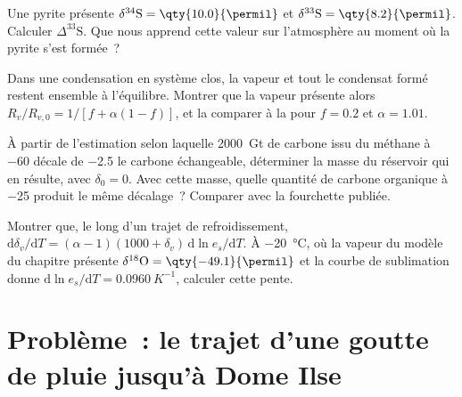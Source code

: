 \begin{exercise}[$\star\star$]\label{exo:b3:stable-isotopes:9}
Une pyrite présente $\delta^{34}\mathrm S = \qty{10.0}{\permil}$ et $\delta^{33}\mathrm S =
\qty{8.2}{\permil}$. Calculer $\Delta^{33}\mathrm S$. Que nous apprend cette valeur sur
l'atmosphère au moment où la pyrite s'est formée~?
\end{exercise}

\begin{exercise}[$\star\star\star$]\label{exo:b3:stable-isotopes:10}
Dans une condensation en système clos, la vapeur et tout le condensat formé restent
ensemble à l'équilibre. Montrer que la vapeur présente alors $R_v/R_{v,0} = 1/[f +
\alpha(1 - f)]$, et la comparer à la  pour $f = 0.2$ et
$\alpha = 1.01$.
\end{exercise}

\begin{exercise}[$\star\star\star$]\label{exo:b3:stable-isotopes:11}
À partir de l'estimation selon laquelle \qty{2000}{Gt} de carbone issu du méthane à
\qty{-60}{\permil} décale de \qty{-2.5}{\permil} le carbone échangeable,
déterminer la masse du réservoir qui en résulte, avec $\delta_0 = 0$. Avec cette masse, quelle quantité de
carbone organique à \qty{-25}{\permil} produit le même décalage~? Comparer avec la
fourchette publiée.
\end{exercise}

\begin{exercise}[$\star\star\star$]\label{exo:b3:stable-isotopes:12}
Montrer que, le long d'un trajet de refroidissement, $\mathrm d\delta_v/\mathrm dT = (\alpha - 1)(1000 +
\delta_v)\,\mathrm d\ln e_s/\mathrm dT$. À \qty{-20}{\celsius}, où la
vapeur du modèle du chapitre présente $\delta^{18}\mathrm O = \qty{-49.1}{\permil}$
et la courbe de sublimation donne $\mathrm d\ln e_s/\mathrm dT =
\qty{0.0960}{K^{-1}}$, calculer cette pente.
\end{exercise}

\section{Problème~: le trajet d'une goutte de pluie jusqu'à Dome Ilse}

